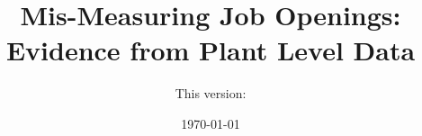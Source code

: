 \documentclass[a4paper,12pt,article]{memoir}
\title{Mis-Measuring Job Openings: \\ Evidence from Plant Level Data}
\author{This version:}
\date{\today{}}
\begin{document}
\maketitle 

\begin{abstract}

\end{abstract}


\newpage

\FloatBarrier	

\FloatBarrier

\FloatBarrier

\FloatBarrier

%
\FloatBarrier

\FloatBarrier
\newpage

\clearpage 

\end{document}
